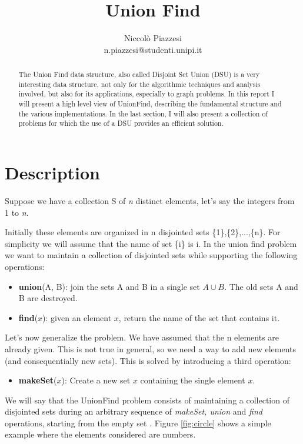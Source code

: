 \documentclass{article}
\begin{document}
\title{ \textbf{Union Find}}
\author{Niccolò Piazzesi\\n.piazzesi@studenti.unipi.it}
\maketitle
\begin{abstract}
The Union Find data structure, also called Disjoint Set Union (DSU) is a very interesting data structure, not 
only  for the algorithmic techniques and  analysis involved, but also for its applications, especially to graph problems. In this
report I will present a high level view of UnionFind, describing the fundamental structure and the various implementations. In the last section, I will also present
a collection of problems for which the use of a DSU provides an efficient solution.
\end{abstract}
\section{Description}
Suppose we have a collection S of \emph{n} distinct elements, let's say the integers from 1 to \emph{n}. 

Initially these elements
are organized in n disjointed sets \{1\},\{2\},...,\{n\}. For simplicity we will assume that the name of set \{i\}
is i. In the union find problem we want to maintain a collection of disjointed sets while supporting the following operations:
\begin{itemize}
    \item \textbf{union}(A, B): join the sets A and B in a single set $A \cup B$. The old sets A and B are destroyed.
    \item \textbf{find}($x$): given an element $x$, return the name of the set that contains it.
\end{itemize}
Let's now generalize the problem. We have assumed that the n elements are already given. This is not true in general, so we need a way to 
add new elements (and consequentially new sets). This is solved by introducing a third operation:
\begin{itemize}
    \item \textbf{makeSet}($x$): Create a new set {$x$} containing the single element $x$.
\end{itemize}
    We will say that the UnionFind problem consists of maintaining a collection of disjointed sets during 
an arbitrary sequence of \emph{makeSet, union} and \emph{find} operations, starting from the empty set \cite{demetrescu}. Figure \ref{fig:circle} shows a
simple example where the elements considered are numbers.
\end{document}
